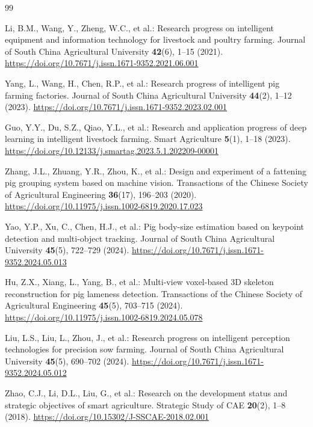 \documentclass[runningheads]{llncs}
\begin{document}
\begin{thebibliography}{99}

Li, B.M., Wang, Y., Zheng, W.C., et al.: Research progress on intelligent equipment and information technology for livestock and poultry farming. Journal of South China Agricultural University \textbf{42}(6), 1--15 (2021). \url{https://doi.org/10.7671/j.issn.1671-9352.2021.06.001}

Yang, L., Wang, H., Chen, R.P., et al.: Research progress of intelligent pig farming factories. Journal of South China Agricultural University \textbf{44}(2), 1--12 (2023). \url{https://doi.org/10.7671/j.issn.1671-9352.2023.02.001}

Guo, Y.Y., Du, S.Z., Qiao, Y.L., et al.: Research and application progress of deep learning in intelligent livestock farming. Smart Agriculture \textbf{5}(1), 1--18 (2023). \url{https://doi.org/10.12133/j.smartag.2023.5.1.202209-00001}

Zhang, J.L., Zhuang, Y.R., Zhou, K., et al.: Design and experiment of a fattening pig grouping system based on machine vision. Transactions of the Chinese Society of Agricultural Engineering \textbf{36}(17), 196--203 (2020). \url{https://doi.org/10.11975/j.issn.1002-6819.2020.17.023}

Yao, Y.P., Xu, C., Chen, H.J., et al.: Pig body-size estimation based on keypoint detection and multi-object tracking. Journal of South China Agricultural University \textbf{45}(5), 722--729 (2024). \url{https://doi.org/10.7671/j.issn.1671-9352.2024.05.013}

Hu, Z.X., Xiang, L., Yang, B., et al.: Multi-view voxel-based 3D skeleton reconstruction for pig lameness detection. Transactions of the Chinese Society of Agricultural Engineering \textbf{45}(5), 703--715 (2024). \url{https://doi.org/10.11975/j.issn.1002-6819.2024.05.078}

Liu, L.S., Liu, L., Zhou, J., et al.: Research progress on intelligent perception technologies for precision sow farming. Journal of South China Agricultural University \textbf{45}(5), 690--702 (2024). \url{https://doi.org/10.7671/j.issn.1671-9352.2024.05.012}

Zhao, C.J., Li, D.L., Liu, G., et al.: Research on the development status and strategic objectives of smart agriculture. Strategic Study of CAE \textbf{20}(2), 1--8 (2018). \url{https://doi.org/10.15302/J-SSCAE-2018.02.001}


\end{thebibliography}
\end{document}
